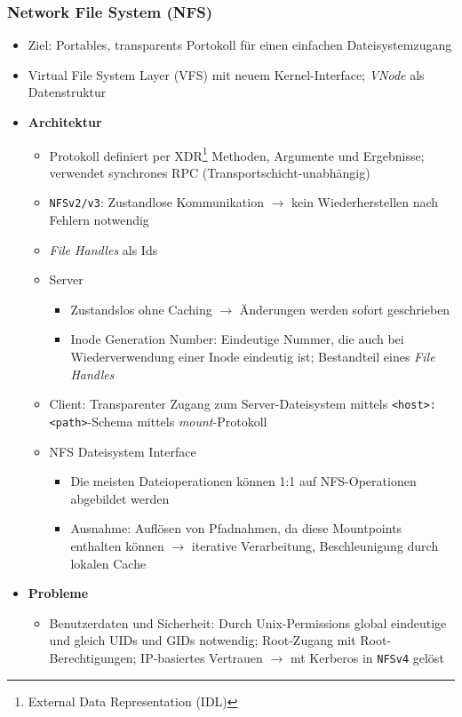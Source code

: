 \subsubsection{Network File System (NFS)}
\begin{itemize}
	\item Ziel: Portables, transparents Portokoll für einen einfachen Dateisystemzugang
	\item Virtual File System Layer (VFS) mit neuem Kernel-Interface; \textit{VNode} als Datenstruktur
	\item \textbf{Architektur}
	\begin{itemize}
		\item Protokoll definiert per XDR\footnote{External Data Representation (IDL)} Methoden, Argumente und Ergebnisse; verwendet synchrones RPC (Transportschicht-unabhängig)
		\item \texttt{NFSv2/v3}: Zustandlose Kommunikation \(\rightarrow\) kein Wiederherstellen nach Fehlern notwendig
		\item \textit{File Handles} als Ids
		\item Server
		\begin{itemize}
			\item Zustandslos ohne Caching \(\rightarrow\) Änderungen werden sofort geschrieben
			\item Inode Generation Number: Eindeutige Nummer, die auch bei Wiederverwendung einer Inode eindeutig ist; Bestandteil eines \textit{File Handles}
		\end{itemize}
		\item Client: Transparenter Zugang zum Server-Dateisystem mittels \texttt{<host>:<path>}-Schema mittels \textit{mount}-Protokoll
		\item NFS Dateisystem Interface
		\begin{itemize}
			\item Die meisten Dateioperationen können 1:1 auf NFS-Operationen abgebildet werden
			\item Ausnahme: Auflösen von Pfadnahmen, da diese Mountpoints enthalten können \(\rightarrow\) iterative Verarbeitung, Beschleunigung durch lokalen Cache
		\end{itemize}
	\end{itemize}
	\item \textbf{Probleme}
	\begin{itemize}
		\item Benutzerdaten und Sicherheit: Durch Unix-Permissions global eindeutige und gleich UIDs und GIDs notwendig; Root-Zugang mit Root-Berechtigungen; IP-basiertes Vertrauen \(\rightarrow\) mt Kerberos in \texttt{NFSv4} gelöst

\end{itemize}
\end{itemize}
